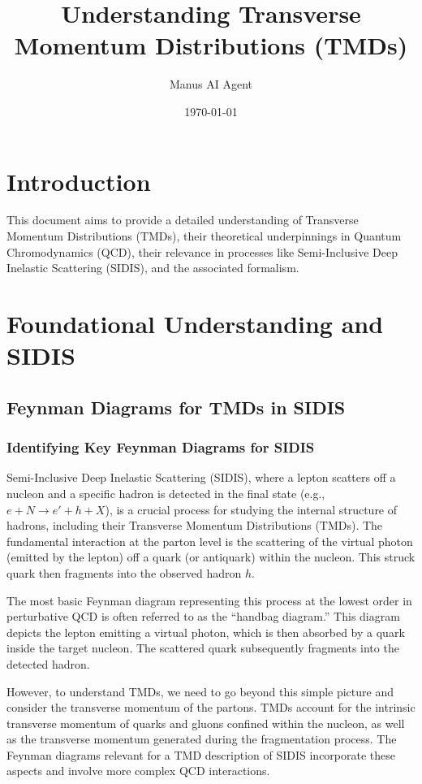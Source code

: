 \documentclass[11pt]{article}
\title{Understanding Transverse Momentum Distributions (TMDs)}
\author{Manus AI Agent}
\date{\today}
\begin{document}
\maketitle
\tableofcontents
\newpage

\section{Introduction}
This document aims to provide a detailed understanding of Transverse Momentum Distributions (TMDs), their theoretical underpinnings in Quantum
Chromodynamics (QCD), their relevance in processes like Semi-Inclusive Deep Inelastic Scattering (SIDIS), and the associated formalism.

\section{Foundational Understanding and SIDIS}

\subsection{Feynman Diagrams for TMDs in SIDIS}

\subsubsection{Identifying Key Feynman Diagrams for SIDIS}

Semi-Inclusive Deep Inelastic Scattering (SIDIS), where a lepton scatters off a nucleon and a specific hadron is detected in the final state (e.g.,
$e + N \rightarrow e' + h + X$), is a crucial process for studying the internal structure of hadrons, including their Transverse Momentum
Distributions (TMDs). The fundamental interaction at the parton level is the scattering of the virtual photon (emitted by the lepton) off a quark (or
antiquark) within the nucleon. This struck quark then fragments into the observed hadron $h$.

The most basic Feynman diagram representing this process at the lowest order in perturbative QCD is often referred to as the ``handbag diagram.''
This diagram depicts the lepton emitting a virtual photon, which is then absorbed by a quark inside the target nucleon. The scattered quark
subsequently fragments into the detected hadron.


However, to understand TMDs, we need to go beyond this simple picture and consider the transverse momentum of the partons. TMDs account for the
intrinsic transverse momentum of quarks and gluons confined within the nucleon, as well as the transverse momentum generated during the fragmentation
process. The Feynman diagrams relevant for a TMD description of SIDIS incorporate these aspects and involve more complex QCD interactions.
\end{document}
